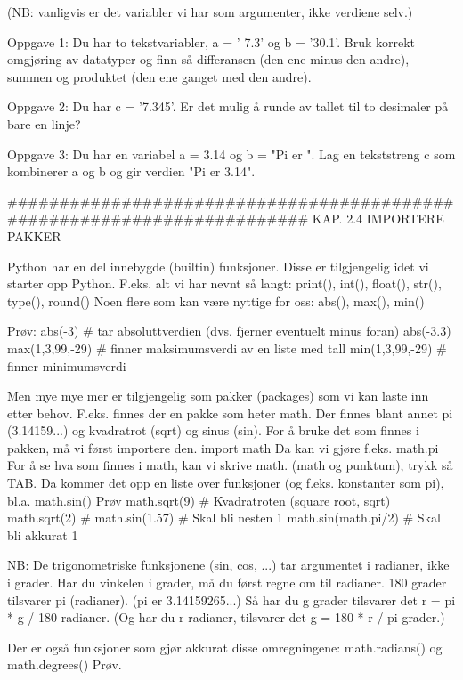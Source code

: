 (NB: vanligvis er det variabler vi har som argumenter, ikke verdiene selv.)  




Oppgave 1: Du har to tekstvariabler, a = ' 7.3' og b = '30.1'.
Bruk korrekt omgjøring av datatyper og finn så differansen (den ene minus den andre),
summen og produktet (den ene ganget med den andre). 

Oppgave 2: Du har c = '7.345'.
Er det mulig å runde av tallet til to desimaler på bare en linje?

Oppgave 3: Du har en variabel a = 3.14 og b = "Pi er ".
Lag en tekststreng c som kombinerer a og b og gir verdien "Pi er 3.14". 

######################################################################## 
KAP. 2.4  IMPORTERE PAKKER

Python har en del innebygde (builtin) funksjoner.
Disse er tilgjengelig idet vi starter opp Python.
F.eks. alt vi har nevnt så langt: print(), int(), float(), str(), type(), round()
Noen flere som kan være nyttige for oss: abs(), max(), min() 

Prøv: 
abs(-3)          # tar absoluttverdien (dvs. fjerner eventuelt minus foran)
abs(-3.3)
max(1,3,99,-29)  # finner maksimumsverdi av en liste med tall
min(1,3,99,-29)  # finner minimumsverdi 


Men mye mye mer er tilgjengelig som pakker (packages) som vi kan laste inn etter behov.
F.eks. finnes der en pakke som heter math.
Der finnes blant annet pi (3.14159...) og kvadratrot (sqrt) og sinus (sin). 
For å bruke det som finnes i pakken, må vi først importere den. 
import math
Da kan vi gjøre f.eks.
math.pi 
For å se hva som finnes i math, kan vi skrive math. (math og punktum), trykk så TAB.
Da kommer det opp en liste over funksjoner (og f.eks. konstanter som pi), bl.a. math.sin()
Prøv
math.sqrt(9)         # Kvadratroten (square root, sqrt)
math.sqrt(2)         # 
math.sin(1.57)       # Skal bli nesten 1
math.sin(math.pi/2)  # Skal bli akkurat 1

NB: De trigonometriske funksjonene (sin, cos, ...) tar argumentet i radianer,
ikke i grader. 
Har du vinkelen i grader, må du først regne om til radianer.
180 grader tilsvarer pi (radianer). (pi er 3.14159265...) 
Så har du g grader tilsvarer det r = pi * g / 180  radianer.
(Og har du r radianer, tilsvarer det g = 180 * r / pi  grader.) 

Der er også funksjoner som gjør akkurat disse omregningene: 
math.radians() og math.degrees()
Prøv. 


